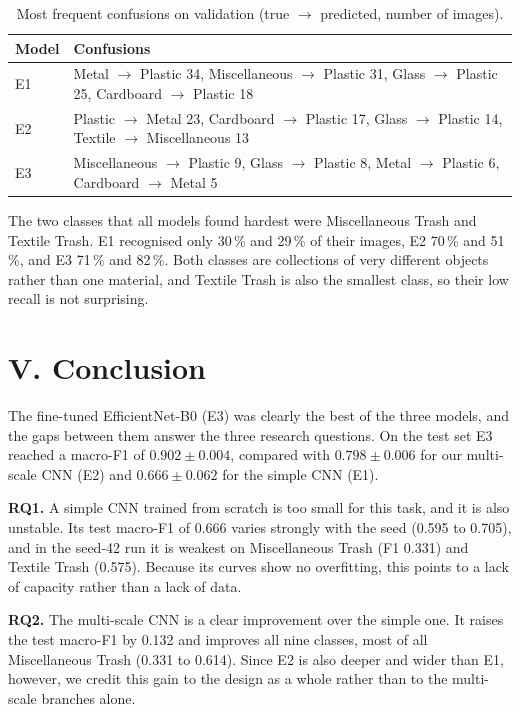 \documentclass{article}
\begin{document}
\begin{table}[H]
\centering
\caption{Most frequent confusions on validation (true $\to$ predicted, number of images).}
\label{tab:conf}
\begin{tabularx}{\textwidth}{lX}
\toprule
Model & Confusions \\
\midrule
E1 & Metal $\to$ Plastic 34, Miscellaneous $\to$ Plastic 31, Glass $\to$ Plastic 25, Cardboard $\to$ Plastic 18 \\
E2 & Plastic $\to$ Metal 23, Cardboard $\to$ Plastic 17, Glass $\to$ Plastic 14, Textile $\to$ Miscellaneous 13 \\
E3 & Miscellaneous $\to$ Plastic 9, Glass $\to$ Plastic 8, Metal $\to$ Plastic 6, Cardboard $\to$ Metal 5 \\
\bottomrule
\end{tabularx}
\end{table}

The two classes that all models found hardest were Miscellaneous Trash and Textile Trash. E1 recognised only 30\,\% and 29\,\% of their images, E2 70\,\% and 51\,\%, and E3 71\,\% and 82\,\%. Both classes are collections of very different objects rather than one material, and Textile Trash is also the smallest class, so their low recall is not surprising.

\section{V. Conclusion}

The fine-tuned EfficientNet-B0 (E3) was clearly the best of the three models, and the gaps between them answer the three research questions. On the test set E3 reached a macro-F1 of $0.902 \pm 0.004$, compared with $0.798 \pm 0.006$ for our multi-scale CNN (E2) and $0.666 \pm 0.062$ for the simple CNN (E1).

\textbf{RQ1.} A simple CNN trained from scratch is too small for this task, and it is also unstable. Its test macro-F1 of 0.666 varies strongly with the seed (0.595 to 0.705), and in the seed-42 run it is weakest on Miscellaneous Trash (F1 0.331) and Textile Trash (0.575). Because its curves show no overfitting, this points to a lack of capacity rather than a lack of data.

\textbf{RQ2.} The multi-scale CNN is a clear improvement over the simple one. It raises the test macro-F1 by 0.132 and improves all nine classes, most of all Miscellaneous Trash (0.331 to 0.614). Since E2 is also deeper and wider than E1, however, we credit this gain to the design as a whole rather than to the multi-scale branches alone.
\end{document}
